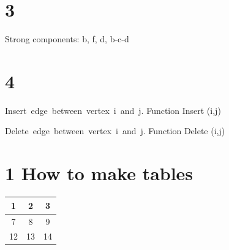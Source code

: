 \documentclass{article}
\begin{document}
\section{3}
Strong components: b, f, d, b-c-d
\section{4}
\begin{algorithm}
	\mbox{Insert edge between vertex i and j.}
	Function Insert (i,j)
\end{algorithm}


\begin{algorithm}
	\mbox{Delete edge between vertex i and j.}
	Function Delete (i,j)
\end{algorithm}


\newpage


\section{1 How to make tables}
\begin {center}
	\begin{tabular}{| c || c | c |}
	\hline
	1 & 2 & 3 \\ \hline
	7 & 8 & 9 \\ \hline
	12 & 13 & 14 \\ \hline
	\end{tabular}
\end{center}
\end{document}
